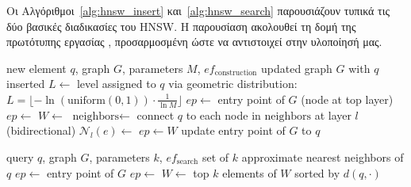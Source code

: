\documentclass[12pt,a4paper]{article}
\begin{document}
Οι Αλγόριθμοι~\ref{alg:hnsw_insert} και~\ref{alg:hnsw_search} παρουσιάζουν τυπικά τις δύο βασικές διαδικασίες του HNSW. Η παρουσίαση ακολουθεί τη δομή της πρωτότυπης εργασίας \cite{malkov2018hnsw}, προσαρμοσμένη ώστε να αντιστοιχεί στην υλοποίησή μας.

\begin{algorithm}[H]
\caption{HNSW Insert}
\label{alg:hnsw_insert}
\begin{algorithmic}[1]
\Require new element $q$, graph $G$, parameters $M$, $ef_{\text{construction}}$
\Ensure updated graph $G$ with $q$ inserted
\State $L \leftarrow$ level assigned to $q$ via geometric distribution: $L = \lfloor -\ln(\text{uniform}(0,1)) \cdot \frac{1}{\ln M} \rfloor$
\State $ep \leftarrow$ entry point of $G$ (node at top layer)
    \State $ep \leftarrow$ 
\EndFor
{}
    \State $W \leftarrow$ 
    \State $\text{neighbors} \leftarrow$ 
    \State connect $q$ to each node in $\text{neighbors}$ at layer $l$ (bidirectional)
            \State $\mathcal{N}_l(e) \leftarrow$  
        \EndIf
    \EndFor
    \State $ep \leftarrow W$
\EndFor
{}
    \State update entry point of $G$ to $q$
\EndIf
\end{algorithmic}
\end{algorithm}

\begin{algorithm}[H]
\caption{HNSW Search}
\label{alg:hnsw_search}
\begin{algorithmic}[1]
\Require query $q$, graph $G$, parameters $k$, $ef_{\text{search}}$
\Ensure set of $k$ approximate nearest neighbors of $q$
\State $ep \leftarrow$ entry point of $G$
    \State $ep \leftarrow$ 
\EndFor
\State $W \leftarrow$ 
\State \Return top $k$ elements of $W$ sorted by $d(q, \cdot)$
\end{algorithmic}
\end{algorithm}
\end{document}
